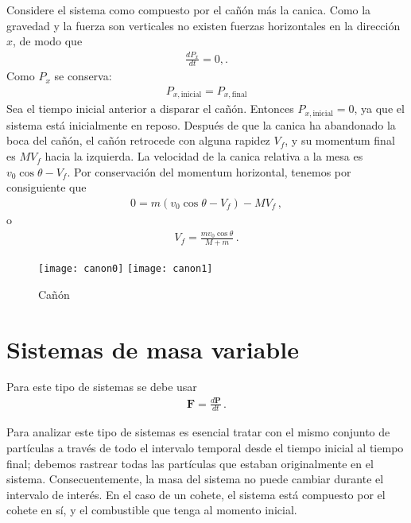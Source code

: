 Considere el sistema como compuesto por el cañón más la canica. Como la gravedad y la fuerza son verticales no existen fuerzas horizontales en la dirección $x$, de modo que
\begin{align}
  \frac{d P_x}{dt}=0,.
\end{align}
Como $P_x$ se conserva:
\begin{align}
  P_{x,\text{inicial}}=P_{x,\text{final}}
\end{align}
Sea el tiempo inicial anterior a disparar el cañón. Entonces $P_{x,\text{inicial}}=0$, ya que el sistema está inicialmente en reposo. Después de que la canica ha abandonado la boca del cañón, el cañón retrocede con alguna rapidez $V_f$, y su momentum final es $M V_f$ hacia la izquierda. La velocidad de la canica relativa a la  mesa es $v_0\cos\theta-V_f$. Por conservación del momentum horizontal, tenemos por consiguiente que
\begin{align}
  0=m(v_0\cos\theta-V_f)-M V_f\,,
\end{align}
o
\begin{align}
  V_f=\frac{m v_0\cos\theta}{M+m}\,.
\end{align}
\finejemplo

\begin{frame}
  \begin{figure}
    \centering
{\texttt{[image: canon0]}}
{\texttt{[image: canon1]}}
    \caption{Cañón}
    \label{fig:canon}
  \end{figure}
\end{frame}


\section{Sistemas de masa variable}
Para este tipo de sistemas se debe usar
\begin{align}
  \mathbf{F}=\frac{d\mathbf{P}}{dt}\,.
\end{align}

Para analizar este tipo de sistemas es esencial tratar con el mismo conjunto de partículas a través de todo el intervalo temporal desde el tiempo inicial al tiempo final; debemos rastrear todas las partículas que estaban originalmente en el sistema. Consecuentemente, la masa del sistema no puede cambiar durante el intervalo de interés. En el caso de un cohete, el sistema está compuesto por el cohete en sí, y el combustible que tenga al momento inicial. 



